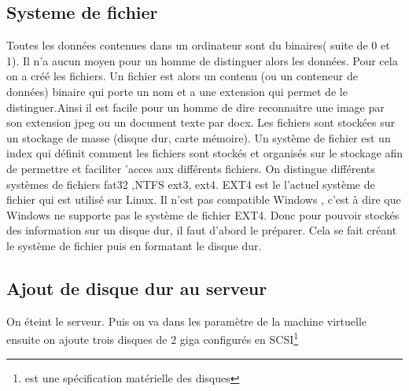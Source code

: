 \documentclass[a4paper,12pt,french]{report} %
\begin{document}
\subsection{Systeme de fichier}
Toutes les données contenues dans un ordinateur sont du binaires( suite de 0 et 1). Il n'a aucun moyen pour un homme de distinguer alors les données. Pour cela on a créé les fichiers. Un fichier est alors un contenu (ou un conteneur de données) binaire qui porte un nom et a une extension qui permet de le distinguer.Ainsi il est facile pour un homme de dire reconnaitre une image par son extension jpeg ou un document texte par docx. Les fichiers sont stockées sur un stockage de masse (disque dur, carte mémoire). Un système de fichier est un index qui définit comment les fichiers sont stockés et organisés sur le stockage afin de permettre et faciliter 'acces aux différents fichiers. On distingue différents systèmes de fichiers fat32 ,NTFS ext3, ext4. EXT4 est le l'actuel système de fichier qui est utilisé sur Linux. Il n'est pas compatible Windows , c'est à dire que Windows ne supporte pas le système de fichier EXT4. Donc pour pouvoir stockés des information sur un disque dur, il faut d'abord le préparer. Cela se fait créant le système de fichier puis en formatant le disque dur.
\subsection{Ajout de disque dur au serveur}
On éteint le serveur. Puis on va dans les paramètre de la machine virtuelle ensuite on ajoute trois disques de 2 giga configurés en SCSI\footnote{ est une spécification matérielle des disques }
\end{document}

